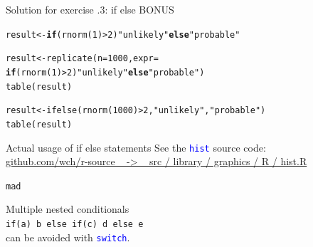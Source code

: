 \documentclass[xcolor=table,           xcolor=dvipsnames]{beamer}\usepackage[]{graphicx}\usepackage[]{color}
\makeatletter
\newcommand{\hlnum}[1]{\textcolor[rgb]{0,0,0}{#1}}
\newcommand{\hlstr}[1]{\textcolor[rgb]{0.545,0.137,0.137}{#1}}
\newcommand{\hlopt}[1]{\textcolor[rgb]{0,0,0}{#1}}
\newcommand{\hlstd}[1]{\textcolor[rgb]{0,0,0}{#1}}
\newcommand{\hlkwa}[1]{\textcolor[rgb]{1,0,0}{\textbf{#1}}}
\newcommand{\hlkwb}[1]{\textcolor[rgb]{0,0,0}{#1}}
\newcommand{\hlkwc}[1]{\textcolor[rgb]{1,0,1}{#1}}
\newcommand{\hlkwd}[1]{\textcolor[rgb]{0,0,1}{#1}}
\newenvironment{kframe}{%
 \def\at@end@of@kframe{}%
 \ifinner\ifhmode%
  \def\at@end@of@kframe{\end{minipage}}%
  \begin{minipage}{\columnwidth}%
 \fi\fi%
 \def\FrameCommand##1{\hskip\@totalleftmargin \hskip-\fboxsep
 \colorbox{shadecolor}{##1}\hskip-\fboxsep
     \hskip-\linewidth \hskip-\@totalleftmargin \hskip\columnwidth}%
 \MakeFramed {\advance\hsize-\width
   \@totalleftmargin\z@ \linewidth\hsize
   \@setminipage}}%
 {\par\unskip\endMakeFramed%
 \at@end@of@kframe}
\newenvironment{knitrout}{}{} %
\newcounter{exercisecount}
\newcommand{\rcode}[1]{\texttt{\textcolor{Blue}{#1}}} %
\makeatother
\begin{document}

\begin{frame}[fragile]{Solution for exercise .3: if else BONUS}
\begin{knitrout}
\color{fgcolor}\begin{kframe}
\begin{alltt}
\hlstd{result} \hlkwb{<-} \hlkwa{if}\hlstd{(}\hlkwd{rnorm}\hlstd{(}\hlnum{1}\hlstd{)}\hlopt{>}\hlnum{2}\hlstd{)} \hlstr{"unlikely"} \hlkwa{else} \hlstr{"probable"}

\hlstd{result} \hlkwb{<-} \hlkwd{replicate}\hlstd{(}\hlkwc{n}\hlstd{=}\hlnum{1000}\hlstd{,} \hlkwc{expr}\hlstd{=}
             \hlkwa{if}\hlstd{(}\hlkwd{rnorm}\hlstd{(}\hlnum{1}\hlstd{)}\hlopt{>}\hlnum{2}\hlstd{)} \hlstr{"unlikely"} \hlkwa{else} \hlstr{"probable"}\hlstd{)}
\hlkwd{table}\hlstd{(result)}

\hlstd{result} \hlkwb{<-} \hlkwd{ifelse}\hlstd{(}\hlkwd{rnorm}\hlstd{(}\hlnum{1000}\hlstd{)}\hlopt{>}\hlnum{2}\hlstd{,} \hlstr{"unlikely"}\hlstd{,} \hlstr{"probable"}\hlstd{)}
\hlkwd{table}\hlstd{(result)}
\end{alltt}
\end{kframe}
\end{knitrout}
\end{frame}


\begin{frame}{Actual usage of if else statements}
See the \rcode{hist} source code: \\
\href{https://github.com/wch/r-source/blob/trunk/src/library/graphics/R/hist.R}{github.com/wch/r-source ~ -> ~ src / library / graphics / R / hist.R}\\[1em]
\pause
\begin{knitrout}
\color{fgcolor}\begin{kframe}
\begin{alltt}
\hlstd{mad}
\end{alltt}
\end{kframe}
\end{knitrout}
\pause
Multiple nested conditionals\\
\texttt{\alert{if}(a) b \alert{else} \alert{if}(c) d \alert{else} e}\\
can be avoided with \rcode{switch}.
\end{frame}
\end{document}

